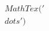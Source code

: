 \documentclass[preview]{standalone}
\begin{document}
\begin{align*}
MathTex('\\dots')
\end{align*}
\end{document}
